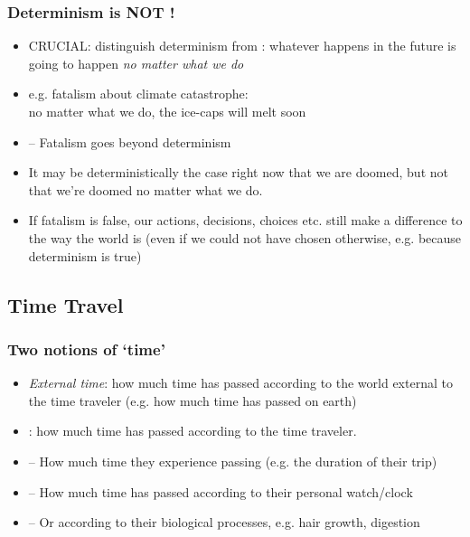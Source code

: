 \begin{frame}
\frametitle{Determinism is NOT !}

\begin{itemize}[<+->]

\item CRUCIAL: distinguish determinism from : whatever happens in the future is going to happen \textit{no matter what we do}

\item e.g. fatalism about climate catastrophe: \\ no matter what we do, the ice-caps will melt soon 

\item[] -- Fatalism goes beyond determinism

\item It may be deterministically the case right now that we are doomed, but not that we're doomed no matter what we do. 

\item If fatalism is false, our actions, decisions, choices etc. still make a difference to the way the world is (even if we could not have chosen otherwise, e.g. because determinism is true)


\end{itemize}
\end{frame}

\subsection{Time Travel}

\begin{frame}
\frametitle{Two notions of `time'}

\begin{itemize}[<+->]

\item \emph{External time}: how much time has passed according to the world external to the time traveler (e.g. how much time has passed on earth)

\item {}: how much time has passed according to the time traveler.
\item[] -- How much time they experience passing (e.g. the duration of their trip)
\item[] -- How much time has passed according to their personal watch/clock
\item[] -- Or according to their biological processes, e.g. hair growth, digestion
\end{itemize}
\end{frame}

